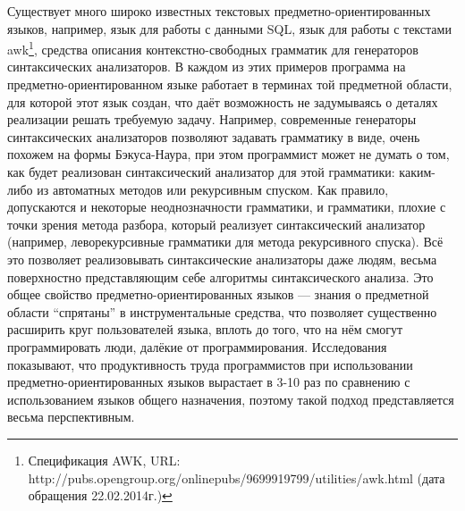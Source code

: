 Существует много широко известных текстовых предметно-ориентированных языков, 
например, язык для работы с данными \ac{SQL}, 
язык для работы с текстами awk\footnote{Спецификация AWK, URL: http://pubs.opengroup.org/onlinepubs/9699919799/utilities/awk.html 
(дата обращения 22.02.2014г.)}, средства описания контекстно-свободных грамматик для генераторов синтаксических 
анализаторов. В каждом из этих примеров программа на предметно-ориентированном 
языке работает в терминах той предметной области, для которой этот язык создан,
что даёт возможность не задумываясь о деталях реализации решать требуемую 
задачу. Например, современные генераторы синтаксических анализаторов позволяют 
задавать грамматику в виде, очень похожем на формы Бэкуса-Наура, при этом 
программист может не думать о том, как будет реализован синтаксический 
анализатор для этой грамматики: каким-либо из автоматных методов или рекурсивным 
спуском. Как правило, допускаются и некоторые неоднозначности грамматики, и 
грамматики, плохие с точки зрения метода разбора, который реализует 
синтаксический анализатор (например, леворекурсивные грамматики для метода 
рекурсивного спуска). Всё это позволяет реализовывать синтаксические анализаторы 
даже людям, весьма поверхностно представляющим себе алгоритмы синтаксического 
анализа. Это общее свойство предметно-ориентированных языков --- знания о 
предметной области "`спрятаны"' в инструментальные средства, что позволяет 
существенно расширить круг пользователей языка, вплоть до того, что на нём 
смогут программировать люди, далёкие от программирования. Исследования 
\cite{kieburtz1996software, kelly2000visual, gray2003examination} показывают, 
что продуктивность труда программистов при использовании 
предметно-ориентированных языков вырастает в 3-10 раз по сравнению с 
использованием языков общего назначения, поэтому такой подход представляется 
весьма перспективным.

